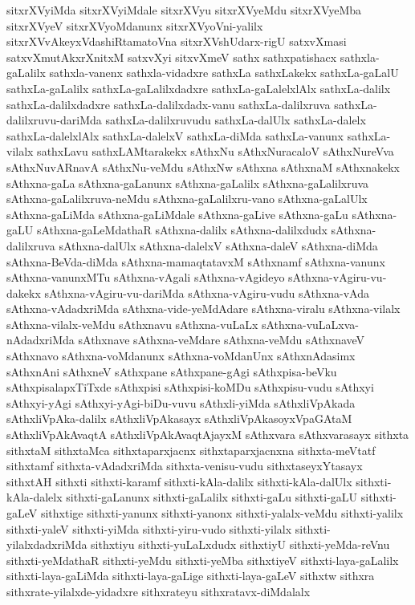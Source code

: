 {sitxrXVyiMda
sitxrXVyiMdale
sitxrXVyu
sitxrXVyeMdu
sitxrXVyeMba
sitxrXVyeV
sitxrXVyoMdanunx
sitxrXVyoVni-yalilx
sitxrXVvAkeyxVdashiRtamatoVna
sitxrXVshUdarx-rigU
satxvXmasi
satxvXmutAkxrXnitxM
satxvXyi
sitxvXmeV
sathx
sathxpatishacx
sathxla-gaLalilx
sathxla-vanenx
sathxla-vidadxre
sathxLa
sathxLakekx
sathxLa-gaLalU
sathxLa-gaLalilx
sathxLa-gaLalilxdadxre
sathxLa-gaLalelxlAlx
sathxLa-dalilx
sathxLa-dalilxdadxre
sathxLa-dalilxdadx-vanu
sathxLa-dalilxruva
sathxLa-dalilxruvu-dariMda
sathxLa-dalilxruvudu
sathxLa-dalUlx
sathxLa-dalelx
sathxLa-dalelxlAlx
sathxLa-dalelxV
sathxLa-diMda
sathxLa-vanunx
sathxLa-vilalx
sathxLavu
sathxLAMtarakekx
sAthxNu
sAthxNuracaloV
sAthxNureVva
sAthxNuvARnavA
sAthxNu-veMdu
sAthxNw
sAthxna
sAthxnaM
sAthxnakekx
sAthxna-gaLa
sAthxna-gaLanunx
sAthxna-gaLalilx
sAthxna-gaLalilxruva
sAthxna-gaLalilxruva-neMdu
sAthxna-gaLalilxru-vano
sAthxna-gaLalUlx
sAthxna-gaLiMda
sAthxna-gaLiMdale
sAthxna-gaLive
sAthxna-gaLu
sAthxna-gaLU
sAthxna-gaLeMdathaR
sAthxna-dalilx
sAthxna-dalilxdudx
sAthxna-dalilxruva
sAthxna-dalUlx
sAthxna-dalelxV
sAthxna-daleV
sAthxna-diMda
sAthxna-BeVda-diMda
sAthxna-mamaqtatavxM
sAthxnamf
sAthxna-vanunx
sAthxna-vanunxMTu
sAthxna-vAgali
sAthxna-vAgideyo
sAthxna-vAgiru-vu-dakekx
sAthxna-vAgiru-vu-dariMda
sAthxna-vAgiru-vudu
sAthxna-vAda
sAthxna-vAdadxriMda
sAthxna-vide-yeMdAdare
sAthxna-viralu
sAthxna-vilalx
sAthxna-vilalx-veMdu
sAthxnavu
sAthxna-vuLaLx
sAthxna-vuLaLxva-nAdadxriMda
sAthxnave
sAthxna-veMdare
sAthxna-veMdu
sAthxnaveV
sAthxnavo
sAthxna-voMdanunx
sAthxna-voMdanUnx
sAthxnAdasimx
sAthxnAni
sAthxneV
sAthxpane
sAthxpane-gAgi
sAthxpisa-beVku
sAthxpisalapxTiTxde
sAthxpisi
sAthxpisi-koMDu
sAthxpisu-vudu
sAthxyi
sAthxyi-yAgi
sAthxyi-yAgi-biDu-vuvu
sAthxli-yiMda
sAthxliVpAkada
sAthxliVpAka-dalilx
sAthxliVpAkasayx
sAthxliVpAkasoyxVpaGAtaM
sAthxliVpAkAvaqtA
sAthxliVpAkAvaqtAjayxM
sAthxvara
sAthxvarasayx
sithxta
sithxtaM
sithxtaMca
sithxtaparxjacnx
sithxtaparxjacnxna
sithxta-meVtatf
sithxtamf
sithxta-vAdadxriMda
sithxta-venisu-vudu
sithxtaseyxYtasayx
sithxtAH
sithxti
sithxti-karamf
sithxti-kAla-dalilx
sithxti-kAla-dalUlx
sithxti-kAla-dalelx
sithxti-gaLanunx
sithxti-gaLalilx
sithxti-gaLu
sithxti-gaLU
sithxti-gaLeV
sithxtige
sithxti-yanunx
sithxti-yanonx
sithxti-yalalx-veMdu
sithxti-yalilx
sithxti-yaleV
sithxti-yiMda
sithxti-yiru-vudo
sithxti-yilalx
sithxti-yilalxdadxriMda
sithxtiyu
sithxti-yuLaLxdudx
sithxtiyU
sithxti-yeMda-reVnu
sithxti-yeMdathaR
sithxti-yeMdu
sithxti-yeMba
sithxtiyeV
sithxti-laya-gaLalilx
sithxti-laya-gaLiMda
sithxti-laya-gaLige
sithxti-laya-gaLeV
sithxtw
sithxra
sithxrate-yilalxde-yidadxre
sithxrateyu
sithxratavx-diMdalalx
}
